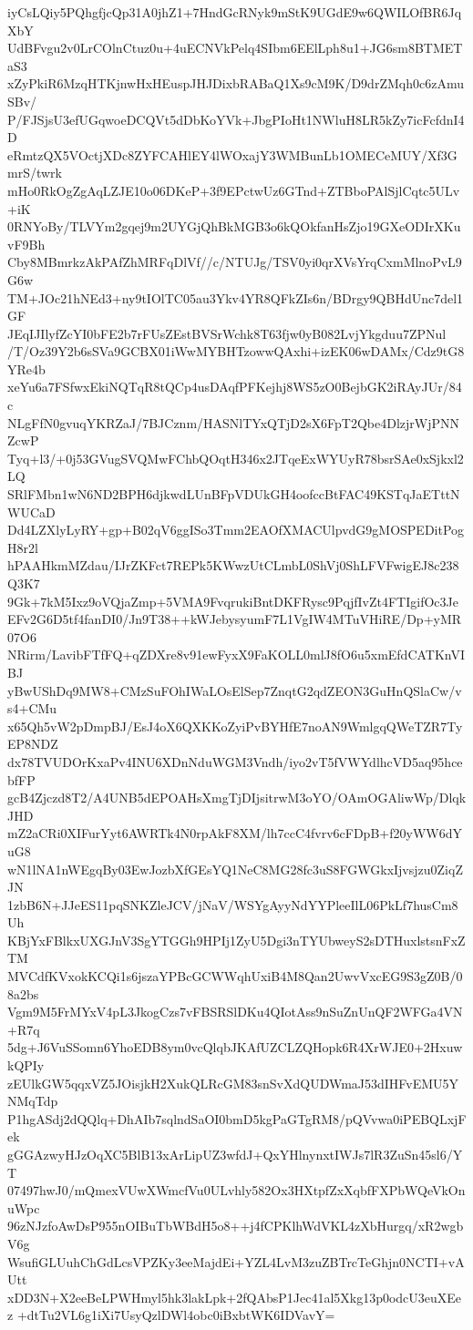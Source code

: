 iyCsLQiy5PQhgfjcQp31A0jhZ1+7HndGcRNyk9mStK9UGdE9w6QWILOfBR6JqXbY
UdBFvgu2v0LrCOlnCtuz0u+4uECNVkPelq4SIbm6EElLph8u1+JG6sm8BTMETaS3
xZyPkiR6MzqHTKjnwHxHEuspJHJDixbRABaQ1Xs9cM9K/D9drZMqh0c6zAmuSBv/
P/FJSjsU3efUGqwoeDCQVt5dDbKoYVk+JbgPIoHt1NWluH8LR5kZy7icFcfdnI4D
eRmtzQX5VOctjXDc8ZYFCAHlEY4lWOxajY3WMBunLb1OMECeMUY/Xf3GmrS/twrk
mHo0RkOgZgAqLZJE10o06DKeP+3f9EPctwUz6GTnd+ZTBboPAlSjlCqtc5ULv+iK
0RNYoBy/TLVYm2gqej9m2UYGjQhBkMGB3o6kQOkfanHsZjo19GXeODIrXKuvF9Bh
Cby8MBmrkzAkPAfZhMRFqDlVf//c/NTUJg/TSV0yi0qrXVsYrqCxmMlnoPvL9G6w
TM+JOc21hNEd3+ny9tIOlTC05au3Ykv4YR8QFkZIs6n/BDrgy9QBHdUnc7del1GF
JEqIJIlyfZcYI0bFE2b7rFUsZEstBVSrWchk8T63fjw0yB082LvjYkgduu7ZPNul
/T/Oz39Y2b6sSVa9GCBX01iWwMYBHTzowwQAxhi+izEK06wDAMx/Cdz9tG8YRe4b
xeYu6a7FSfwxEkiNQTqR8tQCp4usDAqfPFKejhj8WS5zO0BejbGK2iRAyJUr/84c
NLgFfN0gvuqYKRZaJ/7BJCznm/HASNlTYxQTjD2sX6FpT2Qbe4DlzjrWjPNNZcwP
Tyq+l3/+0j53GVugSVQMwFChbQOqtH346x2JTqeExWYUyR78bsrSAe0xSjkxl2LQ
SRlFMbn1wN6ND2BPH6djkwdLUnBFpVDUkGH4oofccBtFAC49KSTqJaETttNWUCaD
Dd4LZXlyLyRY+gp+B02qV6ggISo3Tmm2EAOfXMACUlpvdG9gMOSPEDitPogH8r2l
hPAAHkmMZdau/IJrZKFct7REPk5KWwzUtCLmbL0ShVj0ShLFVFwigEJ8c238Q3K7
9Gk+7kM5Ixz9oVQjaZmp+5VMA9FvqrukiBntDKFRysc9PqjfIvZt4FTIgifOc3Je
EFv2G6D5tf4fanDI0/Jn9T38++kWJebysyumF7L1VgIW4MTuVHiRE/Dp+yMR07O6
NRirm/LavibFTfFQ+qZDXre8v91ewFyxX9FaKOLL0mlJ8fO6u5xmEfdCATKnVIBJ
yBwUShDq9MW8+CMzSuFOhIWaLOsElSep7ZnqtG2qdZEON3GuHnQSlaCw/vs4+CMu
x65Qh5vW2pDmpBJ/EsJ4oX6QXKKoZyiPvBYHfE7noAN9WmlgqQWeTZR7TyEP8NDZ
dx78TVUDOrKxaPv4INU6XDnNduWGM3Vndh/iyo2vT5fVWYdlhcVD5aq95hcebfFP
gcB4Zjczd8T2/A4UNB5dEPOAHsXmgTjDIjsitrwM3oYO/OAmOGAliwWp/DlqkJHD
mZ2aCRi0XIFurYyt6AWRTk4N0rpAkF8XM/lh7ccC4fvrv6cFDpB+f20yWW6dYuG8
wN1lNA1nWEgqBy03EwJozbXfGEsYQ1NeC8MG28fc3uS8FGWGkxIjvsjzu0ZiqZJN
1zbB6N+JJeES11pqSNKZleJCV/jNaV/WSYgAyyNdYYPleeIlL06PkLf7husCm8Uh
KBjYxFBlkxUXGJnV3SgYTGGh9HPIj1ZyU5Dgi3nTYUbweyS2sDTHuxlstsnFxZTM
MVCdfKVxokKCQi1s6jszaYPBcGCWWqhUxiB4M8Qan2UwvVxcEG9S3gZ0B/08a2bs
Vgm9M5FrMYxV4pL3JkogCzs7vFBSRSlDKu4QIotAss9nSuZnUnQF2WFGa4VN+R7q
5dg+J6VuSSomn6YhoEDB8ym0vcQlqbJKAfUZCLZQHopk6R4XrWJE0+2HxuwkQPIy
zEUlkGW5qqxVZ5JOisjkH2XukQLRcGM83snSvXdQUDWmaJ53dIHFvEMU5YNMqTdp
P1hgASdj2dQQlq+DhAIb7sqlndSaOI0bmD5kgPaGTgRM8/pQVvwa0iPEBQLxjFek
gGGAzwyHJzOqXC5BlB13xArLipUZ3wfdJ+QxYHlnynxtIWJs7lR3ZuSn45sl6/YT
07497hwJ0/mQmexVUwXWmcfVu0ULvhly582Ox3HXtpfZxXqbfFXPbWQeVkOnuWpc
96zNJzfoAwDsP955nOIBuTbWBdH5o8++j4fCPKlhWdVKL4zXbHurgq/xR2wgbV6g
WsufiGLUuhChGdLcsVPZKy3eeMajdEi+YZL4LvM3zuZBTrcTeGhjn0NCTI+vAUtt
xDD3N+X2eeBeLPWHmyl5hk3lakLpk+2fQAbsP1Jec41al5Xkg13p0odcU3euXEez
+dtTu2VL6g1iXi7UsyQzlDWl4obc0iBxbtWK6IDVavY=
